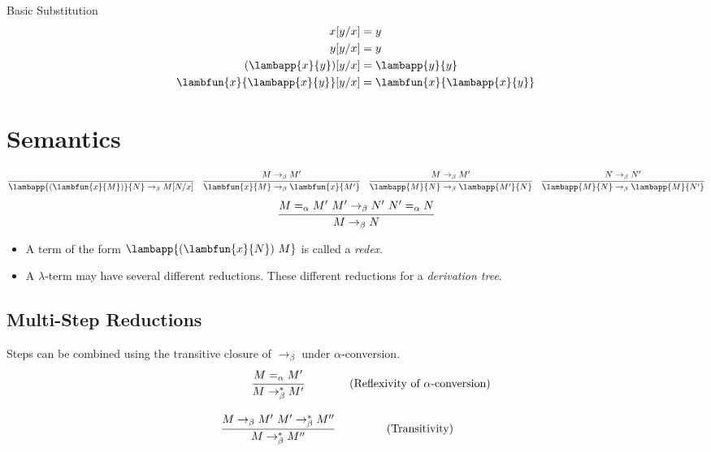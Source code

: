 \begin{examplebox}{Basic Substitution}
	\[\begin{split}
			x[y/x] &= y \\
			y[y/x] &= y \\
			(\lambapp{x}{y})[y/x] &= \lambapp{y}{y} \\
			\lambfun{x}{\lambapp{x}{y}}[y/x] &= \lambfun{x}{\lambapp{x}{y}} \\
		\end{split}\]
\end{examplebox}

\section{Semantics}
\[\begin{matrix}
		\cfrac{}{\lambapp{(\lambfun{x}{M})}{N} \to_\beta M[N/x]}         &
		\cfrac{M \to_\beta M'}{\lambfun{x}{M} \to_\beta \lambfun{x}{M'}} &
		\cfrac{M \to_\beta M'}{\lambapp{M}{N} \to_\beta \lambapp{M'}{N}} &
		\cfrac{N \to_\beta N'}{\lambapp{M}{N} \to_\beta \lambapp{M}{N'}}   \\
	\end{matrix}
\]
\[\cfrac{M =_\alpha M' \ M' \to_\beta N' \ N' =_\alpha N }{M \to_\beta N}\]

\begin{itemize}
	\item A term of the form $\lambapp{(\lambfun{x}{N}) \ M}$ is called a \textit{redex}.
	\item A $\lambda$-term may have several different reductions. These different reductions for a \textit{derivation tree}.
\end{itemize}

\subsection{Multi-Step Reductions}
Steps can be combined using the transitive closure of $\to_\beta$ under $\alpha$-conversion.
\[\begin{matrix}
		\cfrac{M =_\alpha M'}{M \to^*_\beta M'}                        & \text{  (Reflexivity of $\alpha$-conversion)} \\
		\\
		\cfrac{M \to_\beta M' \ M' \to^*_\beta M''}{M \to^*_\beta M''} & \text{  (Transitivity)}                       \\
	\end{matrix}\]

